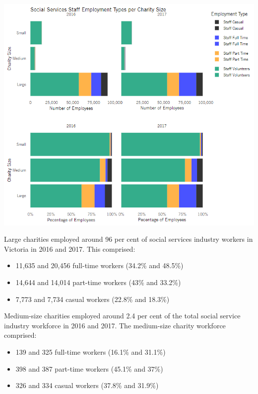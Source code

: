 \documentclass[
  11pt,
]{article}
\providecommand{\tightlist}{%
  \setlength{\itemsep}{0pt}\setlength{\parskip}{0pt}}
\let\origfigure\figure
\let\endorigfigure\endfigure
\renewenvironment{figure}[1][2] {
    \expandafter\origfigure\expandafter[H]
} {
    \endorigfigure
}
\begin{document}
\begin{figure}
\centering
\includegraphics{Fig4 CharSize EmployType.PNG}
\caption{Number of Workers in the Social Services Industry by Organisation Size and Employment Status}
\end{figure}

Large charities employed around 96 per cent of social services industry workers in Victoria in 2016 and 2017.
This comprised:

\begin{itemize}
\tightlist
\item
  11,635 and 20,456 full-time workers (34.2\% and 48.5\%)
\item
  14,644 and 14,014 part-time workers (43\% and 33.2\%)
\item
  7,773 and 7,734 casual workers (22.8\% and 18.3\%)
\end{itemize}

Medium-size charities employed around 2.4 per cent of the total social service industry workforce in 2016 and 2017. The medium-size charity workforce comprised:

\begin{itemize}
\tightlist
\item
  139 and 325 full-time workers (16.1\% and 31.1\%)
\item
  398 and 387 part-time workers (45.1\% and 37\%)
\item
  326 and 334 casual workers (37.8\% and 31.9\%)
\end{itemize}
\end{document}
